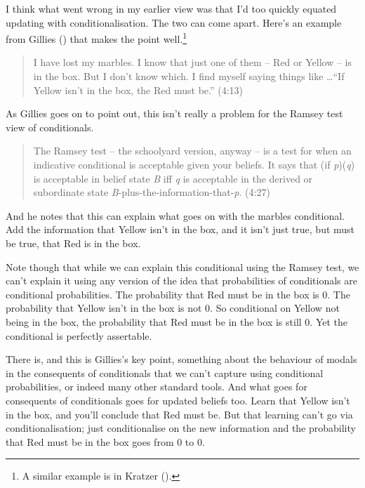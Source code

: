 \documentclass[
  10pt,
  letterpaper,
  DIV=11,
  numbers=noendperiod,
  twoside]{scrartcl}
\begin{document}
I think what went wrong in my earlier view was that I'd too quickly
equated updating with conditionalisation. The two can come apart. Here's
an example from Gillies () that makes
the point well.\footnote{A similar example is in Kratzer
  ().}

\begin{quote}
I have lost my marbles. I know that just one of them -- Red or Yellow --
is in the box. But I don't know which. I find myself saying things like
\ldots{}``If Yellow isn't in the box, the Red must be.'' (4:13)
\end{quote}

As Gillies goes on to point out, this isn't really a problem for the
Ramsey test view of conditionals.

\begin{quote}
The Ramsey test -- the schoolyard version, anyway -- is a test for when
an indicative conditional is acceptable given your beliefs. It says that
(if \emph{p})(\emph{q}) is acceptable in belief state \emph{B} iff
\emph{q} is acceptable in the derived or subordinate state
\emph{B}-plus-the-information-that-\emph{p}. (4:27)
\end{quote}

And he notes that this can explain what goes on with the marbles
conditional. Add the information that Yellow isn't in the box, and it
isn't just true, but must be true, that Red is in the box.

Note though that while we can explain this conditional using the Ramsey
test, we can't explain it using any version of the idea that
probabilities of conditionals are conditional probabilities. The
probability that Red must be in the box is 0. The probability that
Yellow isn't in the box is not 0. So conditional on Yellow not being in
the box, the probability that Red must be in the box is still 0. Yet the
conditional is perfectly assertable.

There is, and this is Gillies's key point, something about the behaviour
of modals in the consequents of conditionals that we can't capture using
conditional probabilities, or indeed many other standard tools. And what
goes for consequents of conditionals goes for updated beliefs too. Learn
that Yellow isn't in the box, and you'll conclude that Red must be. But
that learning can't go via conditionalisation; just conditionalise on
the new information and the probability that Red must be in the box goes
from 0 to 0.
\end{document}
